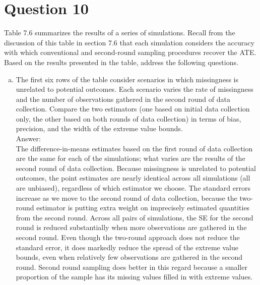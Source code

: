 \documentclass[11pt,notitlepage]{article}\usepackage[]{graphicx}\usepackage[]{color}
\begin{document}
\section*{Question 10}
Table 7.6 summarizes the results of a series of simulations. Recall from the discussion of this table in section 7.6 that each simulation considers the accuracy with which conventional and second-round sampling procedures recover the ATE. Based on the results presented in the table, address the following questions.

\begin{enumerate}[a)]
\item The first six rows of the table consider scenarios in which missingness is unrelated to potential outcomes. Each scenario varies the rate of missingness and the number of observations gathered in the second round of data collection. Compare the two estimators (one based on initial data collection only, the other based on both rounds of data collection) in terms of bias, precision, and the width of the extreme value bounds.\\
Answer:\\
The difference-in-means estimates based on the first round of data collection are the same for each of the simulations; what varies are the results of the second round of data collection.  Because missingness is unrelated to potential outcomes, the point estimates are nearly identical across all simulations (all are unbiased), regardless of which estimator we choose.  The standard errors increase as we move to the second round of data collection, because the two-round estimator is putting extra weight on imprecisely estimated quantities from the second round.  Across all pairs of simulations, the SE for the second round is reduced substantially when more observations are gathered in the second round.  Even though the two-round approach does not reduce the standard error, it does markedly reduce the spread of the extreme value bounds, even when relatively few observations are gathered in the second round.  Second round sampling does better in this regard because a smaller proportion of the sample has its missing values filled in with extreme values. 


\end{enumerate}
\end{document}
